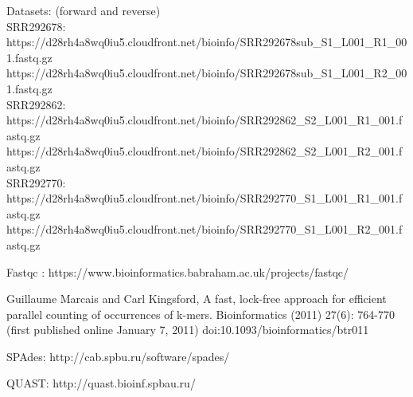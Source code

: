\documentclass{article}
\begin{document}
 
\begin{thebibliography}{9}
 Datasets:  (forward and reverse) \\
SRR292678: \\
https://d28rh4a8wq0iu5.cloudfront.net/bioinfo/SRR292678sub\_S1\_L001\_R1\_001.fastq.gz \\ https://d28rh4a8wq0iu5.cloudfront.net/bioinfo/SRR292678sub\_S1\_L001\_R2\_001.fastq.gz \\
SRR292862: \\
https://d28rh4a8wq0iu5.cloudfront.net/bioinfo/SRR292862\_S2\_L001\_R1\_001.fastq.gz \\ https://d28rh4a8wq0iu5.cloudfront.net/bioinfo/SRR292862\_S2\_L001\_R2\_001.fastq.gz \\
SRR292770: \\
https://d28rh4a8wq0iu5.cloudfront.net/bioinfo/SRR292770\_S1\_L001\_R1\_001.fastq.gz \\
https://d28rh4a8wq0iu5.cloudfront.net/bioinfo/SRR292770\_S1\_L001\_R2\_001.fastq.gz

 Fastqc : https://www.bioinformatics.babraham.ac.uk/projects/fastqc/
 
 
 Guillaume Marcais and Carl Kingsford, A fast, lock-free approach for efficient parallel counting of occurrences of k-mers. Bioinformatics (2011) 27(6): 764-770 (first published online January 7, 2011) doi:10.1093/bioinformatics/btr011
 
 
SPAdes: http://cab.spbu.ru/software/spades/


QUAST: http://quast.bioinf.spbau.ru/

\end{thebibliography}
\end{document}
